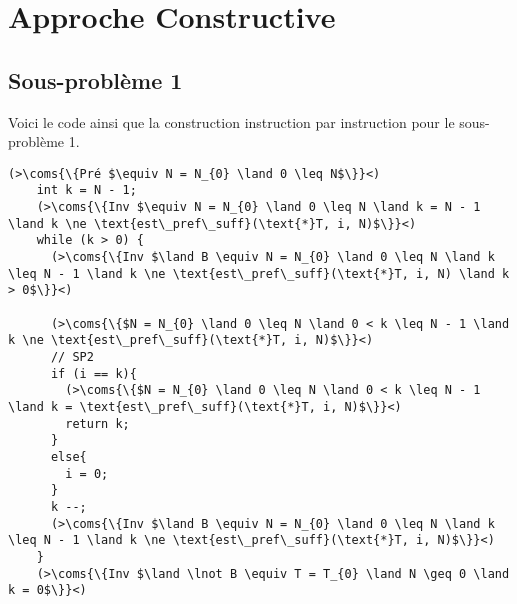 \section{Approche Constructive}

\subsection{Sous-problème 1}

Voici le code ainsi que la construction instruction par instruction pour le sous-problème 1.
\begin{lstlisting}[caption={Sous-problème 1}]
    (>\coms{\{Pré $\equiv N = N_{0} \land 0 \leq N$\}}<)
    int k = N - 1;
    (>\coms{\{Inv $\equiv N = N_{0} \land 0 \leq N \land k = N - 1 \land k \ne \text{est\_pref\_suff}(\text{*}T, i, N)$\}}<)
    while (k > 0) {
      (>\coms{\{Inv $\land B \equiv N = N_{0} \land 0 \leq N \land k \leq N - 1 \land k \ne \text{est\_pref\_suff}(\text{*}T, i, N) \land k > 0$\}}<)

      (>\coms{\{$N = N_{0} \land 0 \leq N \land 0 < k \leq N - 1 \land k \ne \text{est\_pref\_suff}(\text{*}T, i, N)$\}}<)
      // SP2
      if (i == k){
        (>\coms{\{$N = N_{0} \land 0 \leq N \land 0 < k \leq N - 1 \land k = \text{est\_pref\_suff}(\text{*}T, i, N)$\}}<)
        return k;
      }
      else{
        i = 0;
      }
      k --;
      (>\coms{\{Inv $\land B \equiv N = N_{0} \land 0 \leq N \land k \leq N - 1 \land k \ne \text{est\_pref\_suff}(\text{*}T, i, N)$\}}<)
    }
    (>\coms{\{Inv $\land \lnot B \equiv T = T_{0} \land N \geq 0 \land k = 0$\}}<)
\end{lstlisting}


